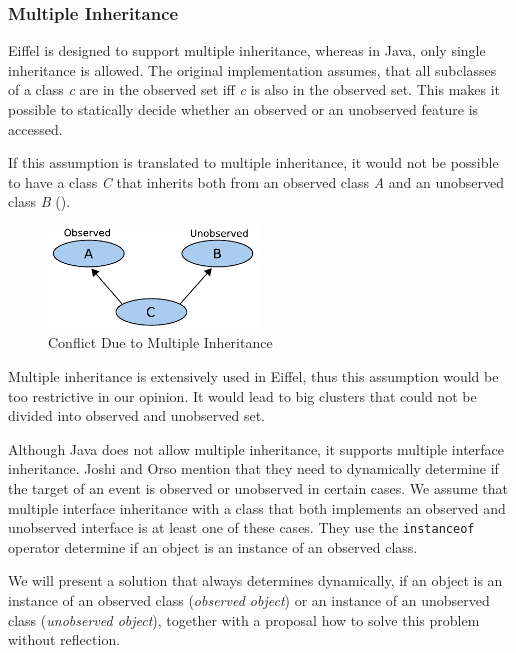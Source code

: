 \subsubsection{Multiple Inheritance}
Eiffel is designed to support multiple inheritance, whereas in Java, only single inheritance is allowed. The original implementation assumes, that all subclasses of a class \emph{c} are in the observed set iff \emph{c} is also in the observed set. This makes it possible to statically decide whether an observed or an unobserved feature is accessed.

If this assumption is translated to multiple inheritance, it would not be possible to have a class \emph{C} that inherits both from an observed class \emph{A} and an unobserved class \emph{B} ().
\begin{figure}[ht]
  \centering
  \includegraphics[width=0.5\textwidth]{illustrations/obs_unobs_multiple_inheritance}
  \caption{Conflict Due to Multiple Inheritance}
  \label{fig:obs_unobs_multiple_inheritance}
\end{figure}

Multiple inheritance is extensively used in Eiffel, thus this assumption would be too restrictive in our opinion. It would lead to big clusters that could not be divided into observed and unobserved set. 

Although Java does not allow multiple inheritance, it supports multiple interface inheritance. Joshi and Orso \cite{orso05may} mention that they need to dynamically determine if the target of an event is observed or unobserved in certain cases. We assume that multiple interface inheritance with a class that both implements an observed and unobserved interface  is at least one of these cases. They use the \texttt{instanceof} operator determine if an object is an instance of an observed class.

We will present a solution that always determines dynamically, if an object is an instance of an observed class (\emph{observed object}) or an instance of an unobserved class (\emph{unobserved object}), together with a proposal how to solve this problem without reflection.

